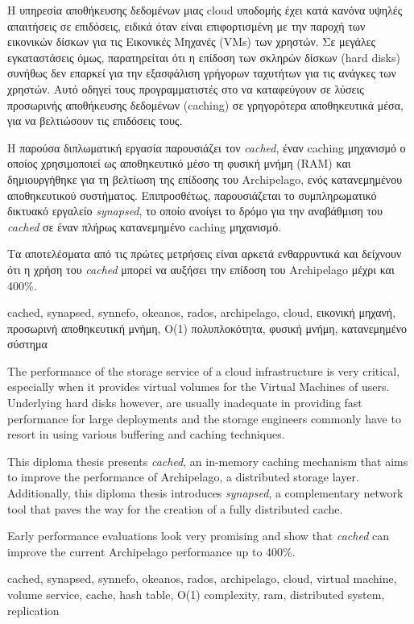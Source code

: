 \begin{abstractgr}
	Η υπηρεσία αποθήκευσης δεδομένων μιας cloud υποδομής έχει κατά κανόνα 
	υψηλές απαιτήσεις σε επιδόσεις, ειδικά όταν είναι επιφορτισμένη με την 
	παροχή των εικονικών δίσκων για τις Εικονικές Μηχανές (VMs) των χρηστών. Σε 
	μεγάλες εγκαταστάσεις όμως, παρατηρείται ότι η επίδοση των σκληρών δίσκων 
	(hard disks) συνήθως δεν επαρκεί για την εξασφάλιση γρήγορων ταχυτήτων για 
	τις ανάγκες των χρηστών. Αυτό οδηγεί τους προγραμματιστές στο να 
	καταφεύγουν σε λύσεις προσωρινής αποθήκευσης δεδομένων (caching) σε 
	γρηγορότερα αποθηκευτικά μέσα, για να βελτιώσουν τις επιδόσεις τους.
	
	Η παρούσα διπλωματική εργασία παρουσιάζει τον \textit{cached}, έναν 
	caching μηχανισμό ο οποίος χρησιμοποιεί ως αποθηκευτικό μέσο τη φυσική 
	μνήμη (RAM) και δημιουργήθηκε για τη βελτίωση της επίδοσης του 
	Archipelago, ενός κατανεμημένου αποθηκευτικού συστήματος.	
	Επιπροσθέτως, παρουσιάζεται το συμπληρωματικό δικτυακό εργαλείο 
	\textit{synapsed}, το οποίο ανοίγει το δρόμο για την αναβάθμιση του 
	\textit{cached} σε έναν πλήρως κατανεμημένο caching μηχανισμό.
	
	Τα αποτελέσματα από τις πρώτες μετρήσεις είναι αρκετά ενθαρρυντικά και 
	δείχνουν ότι η χρήση του \textit{cached} μπορεί να αυξήσει την επίδοση του 
	Archipelago μέχρι και 400\%.
	\begin{keywordsgr}
		cached, synapsed, synnefo, okeanos, rados, archipelago, cloud, εικονική 
		μηχανή, προσωρινή αποθηκευτική μνήμη, Ο(1) πολυπλοκότητα, φυσική μνήμη, 
		κατανεμημένο σύστημα
		\end{keywordsgr}
\end{abstractgr}

\begin{abstracten}
	The performance of the storage service of a cloud infrastructure is very 
	critical, especially when it provides virtual volumes for the Virtual
	Machines of users. Underlying hard disks however, are usually inadequate in 
	providing fast performance for large deployments and the storage engineers 
	commonly have to resort in using various buffering and caching techniques.
	
	This diploma thesis presents \textit{cached}, an in-memory caching 
	mechanism that aims to improve the performance of Archipelago, a 
	distributed storage layer. Additionally, this diploma thesis introduces 
	\textit{synapsed}, a complementary network tool that paves the way for 
	the creation of a fully distributed cache.
	
	Early performance evaluations look very promising and show that 
	\textit{cached} can improve the current Archipelago performance up to 
	400\%.
	\begin{keywordsen}
		cached, synapsed, synnefo, okeanos, rados, archipelago, cloud, 
		virtual machine, volume service, cache, hash table,  O(1) 
		complexity, ram, distributed system, replication
	\end{keywordsen}
\end{abstracten}

\begin{acknowledgementsgr}
	\todo
\end{acknowledgementsgr}
